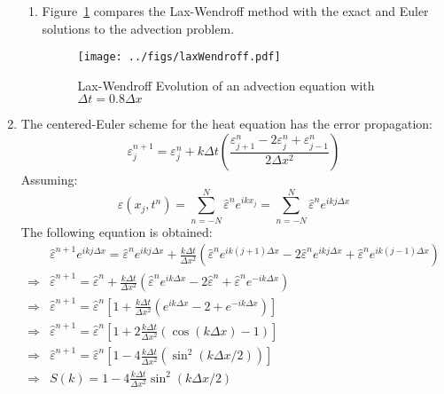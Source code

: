 \documentclass[12pt,a4]{article}
\begin{document}
\begin{enumerate}
\begin{enumerate}
      \item
        Figure~\ref{fig:laxWendrof} compares the Lax-Wendroff method with the exact and Euler solutions to the advection problem.
        \begin{figure}[H]
          \centering
          \texttt{[image: ../figs/laxWendroff.pdf]}
          \caption{Lax-Wendroff Evolution of an advection equation with $\Delta t = 0.8 \Delta x$}
          \label{fig:laxWendrof}
        \end{figure}
    \end{enumerate}
  \item
    The centered-Euler scheme for the heat equation has the error propagation:
    \begin{equation*}
      \varepsilon^{n+1}_j = \varepsilon^n_j + k \Delta t \left(\frac{\varepsilon^n_{j + 1} - 2 \varepsilon^n_j + \varepsilon^n_{j - 1}}{2 \Delta x^2 }\right) 
    \end{equation*}
    Assuming:
    \begin{equation*}
        \varepsilon (x_j, t^n) = \sum_{n = -N}^N \hat \varepsilon^n e^{ikx_j} = \sum_{n = -N}^N \hat \varepsilon^n e^{ikj \Delta x}
    \end{equation*}
    The following equation is obtained:
    \begin{align*}
                  & \hat \varepsilon^{n + 1}e^{i k j\Delta x} = \hat \varepsilon^ne^{ikj\Delta x} + \frac{k \Delta t}{\Delta x^2} \left(\hat \varepsilon^ne^{ik(j + 1 )\Delta x} - 2 \hat \varepsilon^ne^{ikj\Delta x} + \hat \varepsilon^ne^{ik(j - 1 )\Delta x}\right)\\
      \Rightarrow & \hat \varepsilon^{n + 1} = \hat \varepsilon^n + \frac{k \Delta t}{\Delta x^2} \left(\hat \varepsilon^ne^{ik\Delta x} - 2 \hat \varepsilon^n + \hat \varepsilon^ne^{-ik\Delta x}\right)\\
      \Rightarrow & \hat \varepsilon^{n + 1} = \hat \varepsilon^n \left[ 1 + \frac{k \Delta t}{\Delta x^2} \left(e^{ik\Delta x} - 2 + e^{-ik\Delta x}\right)\right]\\
      \Rightarrow & \hat \varepsilon^{n + 1} = \hat \varepsilon^n \left[ 1 + 2\frac{k \Delta t}{\Delta x^2} \left(\cos(k\Delta x) - 1\right)\right]\\
      \Rightarrow & \hat \varepsilon^{n + 1} = \hat \varepsilon^n \left[ 1 - 4\frac{k \Delta t}{\Delta x^2} \left(\sin^2(k\Delta x / 2) \right)\right]\\
      \Rightarrow & S(k) = 1 - 4\frac{k \Delta t}{\Delta x^2} \sin^2(k\Delta x / 2)
    \end{align*}

\end{enumerate}
\end{document}
